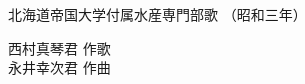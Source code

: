 \documentclass[10pt,b5j]{tarticle} %
\begin{document}
\begin{minipage}[c]{0.7\hsize} %
    \begin{center}
        {\LARGE
            北海道帝国大学付属水産専門部歌 %
        }
        {\small 
            （昭和三年） %
        }
    \end{center}
\end{minipage}
\begin{minipage}[c]{0.3\hsize} %
    \begin{flushright} %
        西村真琴君 作歌\\永井幸次君 作曲 %
    \end{flushright}
\end{minipage}
\end{document}
